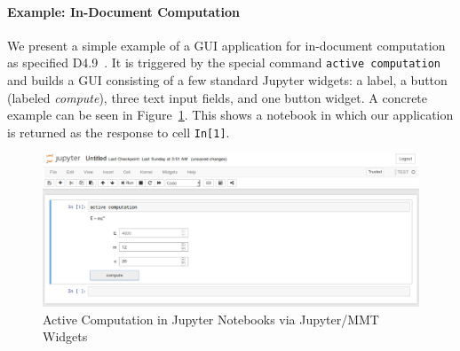 %
%

\paragraph*{Example: In-Document Computation}
We present a simple example of a GUI application for in-document computation as specified D4.9~\cite{ODK-D4.9}.
It is triggered by the special command \texttt{active computation} and builds a GUI consisting of a few standard Jupyter widgets: a label, a button (labeled \textit{compute}), three text input fields, and one button widget.
A concrete example can be seen in Figure~\ref{fig:ac}.
This shows a notebook in which our application is returned as the response to cell \texttt{In[1]}.


\begin{figure}[ht]\centering
  \includegraphics[width=15cm]{activecomp}
  \caption{Active Computation in Jupyter Notebooks via Jupyter/MMT Widgets}\label{fig:ac}
\end{figure}

